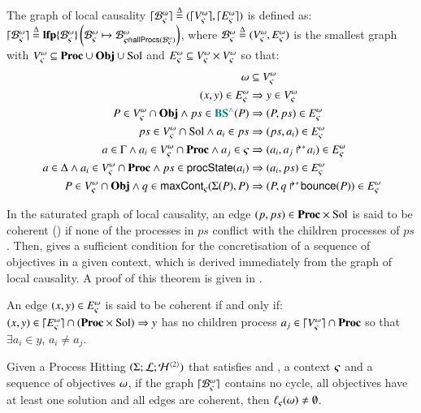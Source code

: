\begin{definition}
\label{def:glc}
  The graph of local causality $\lceil \mathcal{B}_\varsigma^\omega\rceil \stackrel{\Delta}= (\lceil V_\varsigma^\omega\rceil, \lceil E_\varsigma^\omega\rceil)$ is defined as: $\lceil \mathcal{B}_\varsigma^\omega\rceil \stackrel{\Delta}= \mathbf{lfp}\{\mathcal{B}^\omega_\varsigma\}\left(\mathcal{B}^\omega_\varsigma\mapsto\mathcal{B}^\omega_{\varsigma \Cap \mathsf{allProcs}(\mathcal{B}^\omega_\varsigma)}\right)$,
  where $\mathcal{B}^\omega_\varsigma \stackrel{\Delta}= (V_\varsigma^\omega, E_\varsigma^\omega)$ is the smallest graph with
  $V_\varsigma^\omega \subseteq \mathbf{Proc} \cup \mathbf{Obj} \cup \mathrm{Sol}$ and $E_\varsigma^\omega \subseteq V_\varsigma^\omega \times V_\varsigma^\omega$
  so that:
  \begin{align}
    \omega &\subseteq V_\varsigma^\omega \label{eq:Vw} \\
    (x, y) \in E_\varsigma^\omega &\Rightarrow y \in V_\varsigma^\omega \label{eq:VE} \\
    P \in V_\varsigma^\omega \cap \mathbf{Obj} \wedge ps \in \textcolor{teal}{\mathbf{BS}^\wedge}(P) &\Rightarrow (P, ps) \in E_\varsigma^\omega \label{eq:ESol1} \\
    ps \in V_\varsigma^\omega \cap \mathrm{Sol} \wedge a_i \in ps &\Rightarrow (ps, a_i) \in E_\varsigma^\omega \label{eq:ESol2} \\
    a \in \Gamma \wedge a_i \in V_\varsigma^\omega \cap \mathbf{Proc} \wedge a_j \in \varsigma &\Rightarrow (a_i, \mbox{${a}_{j}\Rsh^*\!{a}_{i}$}) \in E_\varsigma^\omega \label{eq:EReq} \\
    a \in \Delta \wedge a_i \in V_\varsigma^\omega \cap \mathbf{Proc} \wedge ps \in \mathsf{procState}(a_i) &\Rightarrow (a_i, ps) \in E_\varsigma^\omega \label{eq:EPrio} \\
    P \in V_\varsigma^\omega \cap \mathbf{Obj} \wedge q \in \mathsf{maxCont}_\varsigma(\Sigma(P), P) &\Rightarrow (P, \mbox{$q\Rsh^*\!\mathsf{bounce}(P)$}) \in E_\varsigma^\omega \label{eq:ECont} \!
  \end{align}
\end{definition}


In the saturated graph of local causality, an edge $(p, ps) \in \mathbf{Proc} \times \mathrm{Sol}$
is said to be coherent () if none of the processes in $ps$ conflict with the children processes of $ps$.
Then,  gives a sufficient condition for the concretisation of a sequence of objectives in a given context,
which is derived immediately from the graph of local causality.
A proof of this theorem is given in .
\begin{definition}
\label{def:coherent}
  An edge $(x, y) \in E_\varsigma^\omega$ is said to be coherent if and only if:
  $(x, y) \in \lceil E_\varsigma^\omega\rceil \cap (\mathbf{Proc} \times \mathrm{Sol}) \Rightarrow y$ has no children process $a_j \in \lceil V_\varsigma^\omega\rceil \cap \mathbf{Proc}$ so that $\exists a_i \in y$, $a_i \neq a_j$.
\end{definition}

\begin{theorem}
\label{th:approxinf}
Given a Process Hitting $(\Sigma; \mathcal{L}; \mathcal{H}^{\langle 2 \rangle})$
that satisfies  and ,
a context $\varsigma$ and a sequence of objectives $\omega$,
  if the graph $\lceil \mathcal{B}_\varsigma^\omega\rceil$ contains no cycle,
  all objectives have at least one solution
  and all edges are coherent,
  then $\ell_\varsigma(\omega) \neq \emptyset$.
\end{theorem}

